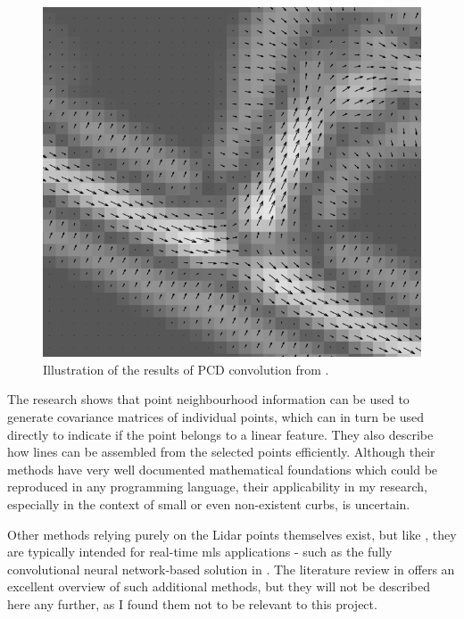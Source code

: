 \begin{figure}
    \includegraphics[width=\linewidth]{final_report/figs/clode_etal_2007_01.png} 
    \caption{Illustration of the results of PCD convolution from \cite{clode_etal_2007}.}
    \label{fig:phasecodeddisk}
\end{figure}

The research \cite{gross_thoennessen_2006} shows that point neighbourhood information can be used to generate covariance matrices of individual points, which can in turn be used directly to indicate if the point belongs to a linear feature. They also describe how lines can be assembled from the selected points efficiently. Although their methods have very well documented mathematical foundations which could be reproduced in any programming language, their applicability in my research, especially in the context of small or even non-existent curbs, is uncertain.

Other methods relying purely on the Lidar points themselves exist, but like \cite{zhang_2010}, they are typically intended for real-time \ac{mls} applications - such as the fully convolutional neural network-based solution in \cite{caltagirone_etal_2017}. The literature review in \cite{yang_etal_2013} offers an excellent overview of such additional methods, but they will not be described here any further, as I found them not to be relevant to this project.


